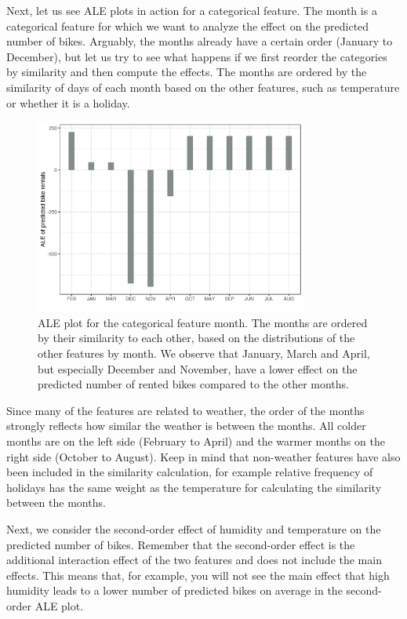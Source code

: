 \documentclass[
  11pt,
]{scrbook}
\begin{document}
Next, let us see ALE plots in action for a categorical feature.
The month is a categorical feature for which we want to analyze the effect on the predicted number of bikes.
Arguably, the months already have a certain order (January to December), but let us try to see what happens if we first reorder the categories by similarity and then compute the effects.
The months are ordered by the similarity of days of each month based on the other features, such as temperature or whether it is a holiday.

\begin{figure}

{\centering \includegraphics[width=0.8\textwidth]{images/ale-bike-cat-1} 

}

\caption{ALE plot for the categorical feature month. The months are ordered by their similarity to each other, based on the distributions of the other features by month. We observe that January, March and April, but especially December and November, have a lower effect on the predicted number of rented bikes compared to the other months.}\label{fig:ale-bike-cat}
\end{figure}

Since many of the features are related to weather, the order of the months strongly reflects how similar the weather is between the months.
All colder months are on the left side (February to April) and the warmer months on the right side (October to August).
Keep in mind that non-weather features have also been included in the similarity calculation, for example relative frequency of holidays has the same weight as the temperature for calculating the similarity between the months.

Next, we consider the second-order effect of humidity and temperature on the predicted number of bikes.
Remember that the second-order effect is the additional interaction effect of the two features and does not include the main effects.
This means that, for example, you will not see the main effect that high humidity leads to a lower number of predicted bikes on average in the second-order ALE plot.
\end{document}
